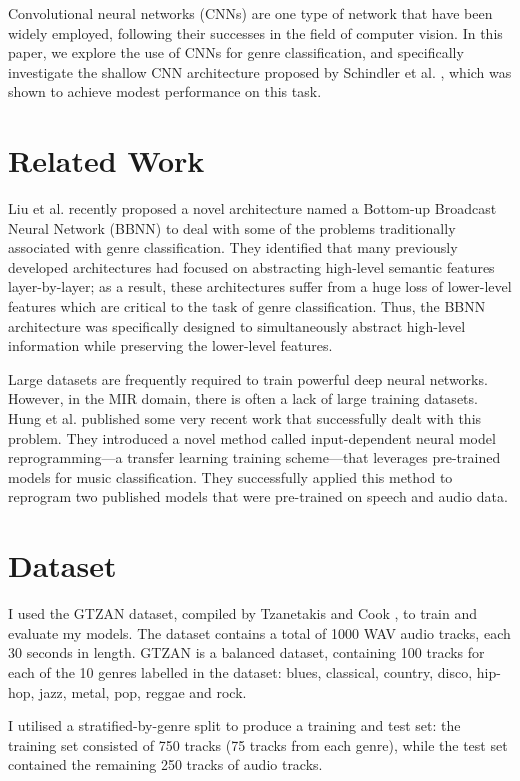 \documentclass[conference]{IEEEtran}
\begin{document}
Convolutional neural networks (CNNs) are one type of network that have been widely employed, following their successes in the field of computer vision.
In this paper, we explore the use of CNNs for genre classification, and specifically investigate the shallow CNN architecture proposed by Schindler et al. \cite{SchindlerLidyRauber}, which was shown to achieve modest performance on this task.

\section{Related Work}

Liu et al. \cite{LiuFengLiuWangLiu} recently proposed a novel architecture named a Bottom-up Broadcast Neural Network (BBNN) to deal with some of the problems traditionally associated with genre classification.
They identified that many previously developed architectures had focused on abstracting high-level semantic features layer-by-layer; as a result, these architectures suffer from a huge loss of lower-level features which are critical to the task of genre classification.
Thus, the BBNN architecture was specifically designed to simultaneously abstract high-level information while preserving the lower-level features.

Large datasets are frequently required to train powerful deep neural networks.
However, in the MIR domain, there is often  a lack of large training datasets.
Hung et al. \cite{HungYangChenLerch} published some very recent work that successfully dealt with this problem.
They introduced a novel method called input-dependent neural model reprogramming---a transfer learning training scheme---that leverages pre-trained models for music classification.
They successfully applied this method to reprogram two published models that were pre-trained on speech and audio data.

\section{Dataset}

I used the GTZAN dataset, compiled by Tzanetakis and Cook \cite{TzanetakisCook}, to train and evaluate my models.
The dataset contains a total of 1000 WAV audio tracks, each 30 seconds in length.
GTZAN is a balanced dataset, containing 100 tracks for each of the 10 genres labelled in the dataset: blues, classical, country, disco, hip-hop, jazz, metal, pop, reggae and rock.

I utilised a stratified-by-genre split to produce a training and test set: the training set consisted of 750 tracks (75 tracks from each genre), while the test set contained the remaining 250 tracks of audio tracks.
\end{document}
